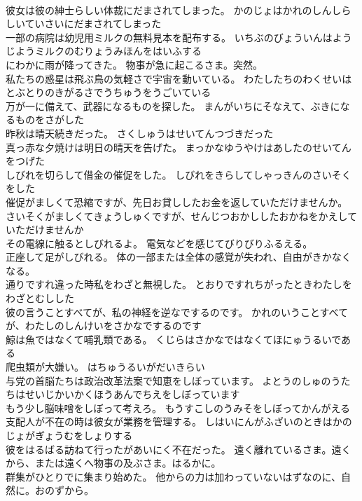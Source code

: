 \documentclass[8pt]{extreport}
\begin{document}
\begin{CJK}{UTF8}{min}
\\	彼女は彼の紳士らしい体裁にだまされてしまった。	かのじょはかれのしんしらしいていさいにだまされてしまった 
\\	一部の病院は幼児用ミルクの無料見本を配布する。	いちぶのびょういんはようじようミルクのむりょうみほんをはいふする 
\\	にわかに雨が降ってきた。	物事が急に起こるさま。突然。
\\	私たちの惑星は飛ぶ鳥の気軽さで宇宙を動いている。	わたしたちのわくせいはとぶとりのきがるさでうちゅうをうごいている 
\\	万が一に備えて、武器になるものを探した。	まんがいちにそなえて、ぶきになるものをさがした 
\\	昨秋は晴天続きだった。	さくしゅうはせいてんつづきだった 
\\	真っ赤な夕焼けは明日の晴天を告げた。	まっかなゆうやけはあしたのせいてんをつげた 
\\	しびれを切らして借金の催促をした。	しびれをきらしてしゃっきんのさいそくをした 
\\	催促がましくて恐縮ですが、先日お貸ししたお金を返していただけませんか。	さいそくがましくてきょうしゅくですが、せんじつおかししたおかねをかえしていただけませんか 
\\	その電線に触るとしびれるよ。	電気などを感じてびりびりふるえる。
\\	正座して足がしびれる。	体の一部または全体の感覚が失われ、自由がきかなくなる。
\\	通りですれ違った時私をわざと無視した。	とおりですれちがったときわたしをわざとむしした 
\\	彼の言うことすべてが、私の神経を逆なでするのです。	かれのいうことすべてが、わたしのしんけいをさかなでするのです 
\\	鯨は魚ではなくて哺乳類である。	くじらはさかなではなくてほにゅうるいである 
\\	爬虫類が大嫌い。	はちゅうるいがだいきらい 
\\	与党の首脳たちは政治改革法案で知恵をしぼっています。	よとうのしゅのうたちはせいじかいかくほうあんでちえをしぼっています 
\\	もう少し脳味噌をしぼって考えろ。	もうすこしのうみそをしぼってかんがえる 
\\	支配人が不在の時は彼女が業務を管理する。	しはいにんがふざいのときはかのじょがぎょうむをしょりする 
\\	彼をはるばる訪ねて行ったがあいにく不在だった。	遠く離れているさま。遠くから、または遠くへ物事の及ぶさま。はるかに。
\\	群集がひとりでに集まり始めた。	他からの力は加わっていないはずなのに、自然に。おのずから。

\end{CJK}
\end{document}
